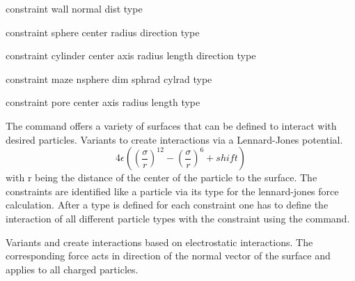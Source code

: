 \begin{essyntax}
  constraint wall normal    
  dist  type 
  
  constraint sphere center    
  radius  direction  type  
  
  constraint cylinder center    
  axis    
  radius  length  
  direction  
  type  
  
  constraint maze nsphere  
  dim  sphrad  cylrad 
  type 
  
  constraint pore center    
  axis    
  radius  length  
  type  
  
  
  

  \begin{features}
  \end{features}
\end{essyntax}

The  command offers a variety of surfaces that can be
defined to interact with desired particles. Variants  to 
create interactions via a
Lennard-Jones potential. \[4 \epsilon \left(\left(\frac{\sigma}{r}\right)^{12} -
  \left(\frac{\sigma}{r}\right)^6 + shift\right)\] with r being the
distance of the center of the particle to the surface. The constraints are identified like a particle via its
type for the lennard-jones force calculation. 
After a type is defined for each constraint one has
to define
the interaction of all different particle types with the constraint using
the  command.

Variants  and  create interactions based on electrostatic
interactions. The corresponding force acts in direction of the normal vector of the
surface and applies to all charged particles.

